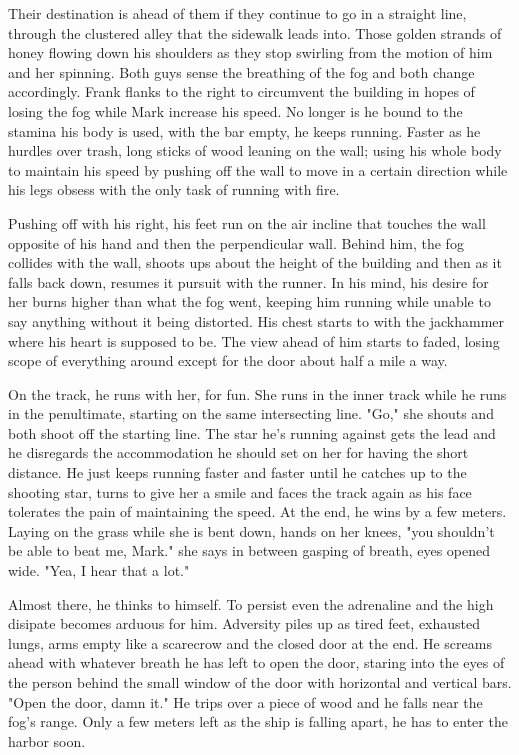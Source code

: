 \begin{Document}
        Their destination is ahead of them if they continue to go in a straight line, through the clustered alley that the sidewalk leads into. Those golden
    strands of honey flowing down his shoulders as they stop swirling from the motion of him and her spinning. Both guys sense the breathing of the fog and
    both change accordingly. Frank flanks to the right to circumvent the building in hopes of losing the fog while Mark increase his speed. No longer is he
    bound to the stamina his body is used, with the bar empty, he keeps running. Faster as he hurdles over trash, long sticks of wood leaning on the wall;
    using his whole body to maintain his speed by pushing off the wall to move in a certain direction while his legs obsess with the only task of running
    with fire.

        Pushing off with his right, his feet run on the air incline that touches the wall opposite of his hand and then the perpendicular wall. Behind him,
    the fog collides with the wall, shoots ups about the height of the building and then as it falls back down, resumes it pursuit with the runner. In his mind,
    his desire for her burns higher than what the fog went, keeping him running while unable to say anything without it being distorted. His chest starts to 
    with the jackhammer where his heart is supposed to be. The view ahead of him starts to faded, losing scope of everything around except for the door about
    half a mile a way.

        On the track, he runs with her, for fun. She runs in the inner track while he runs in the penultimate, starting on the same intersecting line. "Go,"
    she shouts and both shoot off the starting line. The star he's running against gets the lead and he disregards the accommodation he should set on her
    for having the short distance. He just keeps running faster and faster until he catches up to the shooting star, turns to give her a smile and faces
    the track again as his face tolerates the pain of maintaining the speed. At the end, he wins by a few meters. Laying on the grass while she is bent down,
    hands on her knees, "you shouldn't be able to beat me, Mark." she says in between gasping of breath, eyes opened wide. "Yea, I hear that a lot."

        Almost there, he thinks to himself. To persist even the adrenaline and the high disipate becomes arduous for him. Adversity piles up as tired feet,
    exhausted lungs, arms empty like a scarecrow and the closed door at the end. He screams ahead with whatever breath he has left to open the door, staring
    into the eyes of the person behind the small window of the door with horizontal and vertical bars. "Open the door, damn it." He trips over a piece of wood
    and he falls near the fog's range. Only a few meters left as the ship is falling apart, he has to enter the harbor soon.


\end{Document}

